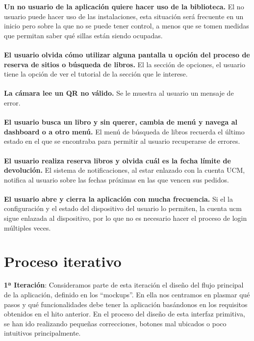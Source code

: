 \documentclass[12pt]{article}
\begin{document}
\textbf{Un no usuario de la aplicación quiere hacer uso de la biblioteca.}
El no usuario puede hacer uso de las instalaciones, esta situación será frecuente en un inicio pero sobre la que no se puede tener control, a menos que se tomen medidas que permitan saber qué sillas están siendo ocupadas.
\\
\\
\textbf{El usuario olvida cómo utilizar alguna pantalla u opción del proceso de reserva de sitios o búsqueda de libros.}
El la sección de opciones, el usuario tiene la opción de ver el tutorial de la sección que le interese.
\\
\\
\textbf{La cámara lee un QR no válido.}
Se le muestra al usuario un mensaje de error.
\\
\\
\textbf{El usuario busca un libro y sin querer, cambia de menú y navega al dashboard o a otro menú.}
El menú de búsqueda de libros recuerda el último estado en el que se encontraba para permitir al usuario recuperarse de errores.
\\
\\
\textbf{El usuario realiza reserva libros y olvida cuál es la fecha límite de devolución.}
El sistema de notificaciones, al estar enlazado con la cuenta UCM, notifica al usuario sobre las fechas próximas en las que vencen sus pedidos.
\\
\\
\textbf{El usuario abre y cierra la aplicación con mucha frecuencia.}
Si el la configuración y el estado del dispositivo del usuario lo permiten, la cuenta ucm sigue enlazada al dispositivo, por lo que no es necesario hacer el proceso de login múltiples veces.


\section{Proceso iterativo}

\textbf{1ª Iteración}:
Consideramos parte de esta iteración el diseño del flujo principal de la aplicación,
definido en los “mockups”. En ella nos centramos en plasmar qué pasos y qué funcionalidades debe tener la aplicación basándonos en los requisitos obtenidos en el hito anterior.
En el proceso del diseño de esta interfaz primitiva, se han ido realizando pequeñas
correcciones, botones mal ubicados o poco intuitivos principalmente.
\end{document}
